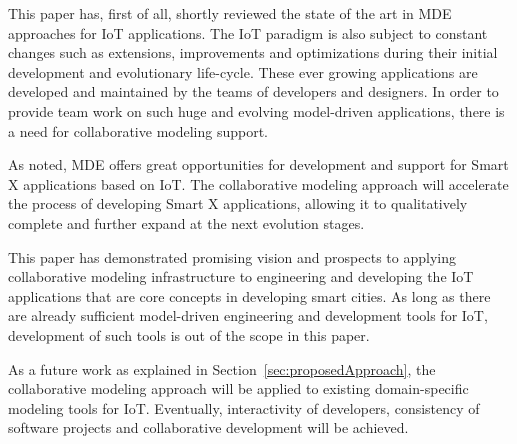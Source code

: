 This paper has, first of all, shortly reviewed the state of the art in MDE approaches for IoT applications. The IoT paradigm is also subject to constant changes such as extensions, improvements and optimizations during their initial development and evolutionary life-cycle. These ever growing applications are developed and maintained by the teams of developers and designers. In order to provide team work on such huge and evolving model-driven applications, there is a need for collaborative modeling support.

As noted, MDE offers great opportunities for development and support for Smart X applications based on IoT. The collaborative modeling approach will accelerate the process of developing Smart X applications, allowing it to qualitatively complete and further expand at the next evolution stages.

This paper has demonstrated promising vision and prospects to applying collaborative modeling infrastructure \cite{Kuryazov+2018} to engineering and developing the IoT applications that are core concepts in developing smart cities. As long as there are already sufficient model-driven engineering and development tools for IoT, development of such tools is out of the scope in this paper.

As a future work as explained in Section~\ref{sec:proposedApproach}, the collaborative modeling approach will be applied to existing domain-specific modeling tools for IoT. Eventually, interactivity of developers, consistency of software projects and collaborative development will be achieved. 